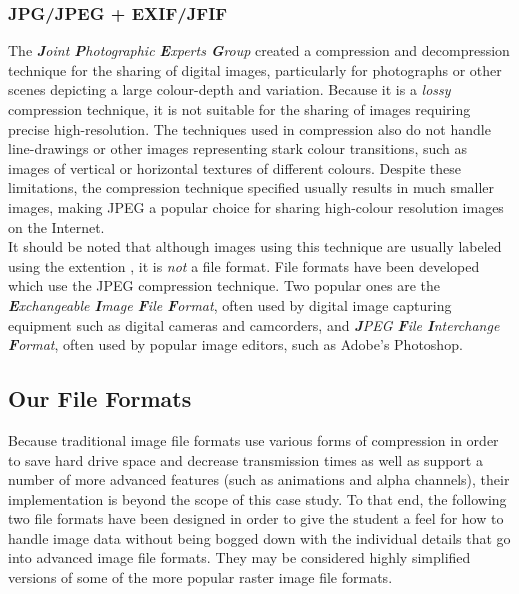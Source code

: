       \subsubsection{JPG/JPEG + EXIF/JFIF}
        The \emph{\textbf{J}oint \textbf{P}hotographic \textbf{E}xperts \textbf{G}roup} created a compression and decompression technique for the sharing of digital images, particularly for photographs or other scenes depicting a large colour-depth and variation. Because it is a \emph{lossy} compression technique, it is not suitable for the sharing of images requiring precise high-resolution. The techniques used in compression also do not handle line-drawings or other images representing stark colour transitions, such as images of vertical or horizontal textures of different colours. Despite these limitations, the compression technique specified usually results in much smaller images, making JPEG a popular choice for sharing high-colour resolution images on the Internet.\\[\baselineskip]
        It should be noted that although images using this technique are usually labeled using the extention , it is \emph{not} a file format. File formats have been developed which use the JPEG compression technique. Two popular ones are the \emph{\textbf{E}xchangeable \textbf{I}mage \textbf{F}ile \textbf{F}ormat}, often used by digital image capturing equipment such as digital cameras and camcorders, and \emph{\textbf{J}PEG \textbf{F}ile \textbf{I}nterchange \textbf{F}ormat}, often used by popular image editors, such as Adobe's Photoshop\textregistered.

    \pagebreak

    \subsection{Our File Formats}
      Because traditional image file formats use various forms of compression in order to save hard drive space and decrease transmission times as well as support a number of more advanced features (such as animations and alpha channels), their implementation is beyond the scope of this case study. To that end, the following two file formats have been designed in order to give the student a feel for how to handle image data without being bogged down with the individual details that go into advanced image file formats. They may be considered highly simplified versions of some of the more popular raster image file formats.
